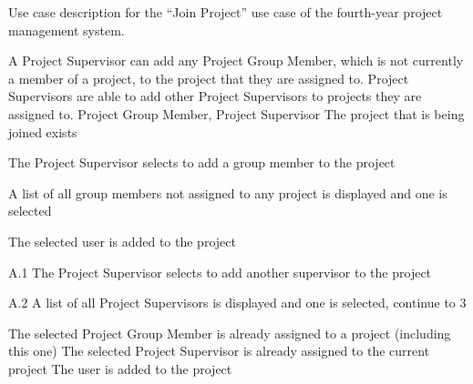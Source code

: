 \begin{table}
  \centering
  \caption{Use case description for the ``Join Project'' use case of the fourth-year project management system.}
  \label{tbl:use-case-join-project}

  \begin{usecase}
    A Project Supervisor can add any Project Group Member, which is not currently a member of a project, to the project that they are assigned to. Project Supervisors are able to add other Project Supervisors to projects they are assigned to.
    Project Group Member, Project Supervisor
    The project that is being joined exists
    \ucnormal
    \begin{ucenum}
      \item The Project Supervisor selects to add a group member to the project
      \item A list of all group members not assigned to any project is displayed and one is selected
      \item The selected user is added to the project
    \end{ucenum}
    \begin{ucenum}
      \item [A.1] The Project Supervisor selects to add another supervisor to the project
      \item [A.2] A list of all Project Supervisors is displayed and one is selected, continue to 3
    \end{ucenum}
    The selected Project Group Member is already assigned to a project (including this one)
    The selected Project Supervisor is already assigned to the current project
    The user is added to the project
  \end{usecase}
\end{table}



